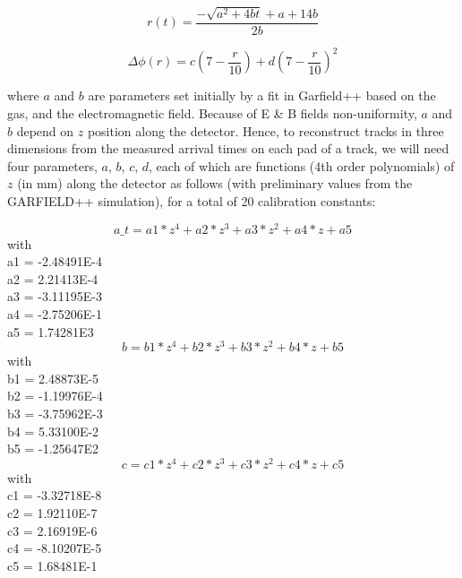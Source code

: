 \documentclass[12pt]{article}
\begin{document}
\begin{equation}
    r(t)= \frac{-\sqrt{a^2 + 4bt} + a + 14b}{2b}
\end{equation}
  
\begin{equation}
   \Delta \phi (r)= c(7-\frac{r}{10}) + d(7-\frac{r}{10})^2
\end{equation}
  
where $a$ and $b$ are parameters set initially by a fit in Garfield++
based on the gas, and the electromagnetic field. Because of E \& B fields 
non-uniformity, $a$ and $b$ depend on $z$ position along the detector. Hence, 
to reconstruct tracks in three dimensions from the measured arrival times on 
each pad of a track, we will need four parameters, $a$, $b$, $c$, $d$, each of 
which are functions (4th order polynomials) of $z$ (in mm) along the detector 
as follows (with preliminary values from the GARFIELD++ simulation), for a 
total of 20 calibration constants:

\begin{equation}
a\_t = a1 * z^4 + a2 * z^3 + a3 *z^2 + a4 * z + a5
\end{equation}
with\\
a1 = -2.48491E-4\\
a2 = 2.21413E-4\\
a3 = -3.11195E-3\\
a4 = -2.75206E-1\\
a5 = 1.74281E3\\

\begin{equation}
b = b1 * z^4 + b2 * z^3 + b3 *z^2 + b4 * z + b5
\end{equation}
with\\
b1 = 2.48873E-5\\
b2 = -1.19976E-4\\
b3 = -3.75962E-3\\
b4 = 5.33100E-2\\
b5 = -1.25647E2\\


\begin{equation}
c = c1 * z^4 + c2 * z^3 + c3 *z^2 + c4 * z + c5
\end{equation}
with\\
c1 = -3.32718E-8\\
c2 = 1.92110E-7\\
c3 = 2.16919E-6\\
c4 = -8.10207E-5\\
c5 = 1.68481E-1\\
\end{document}
